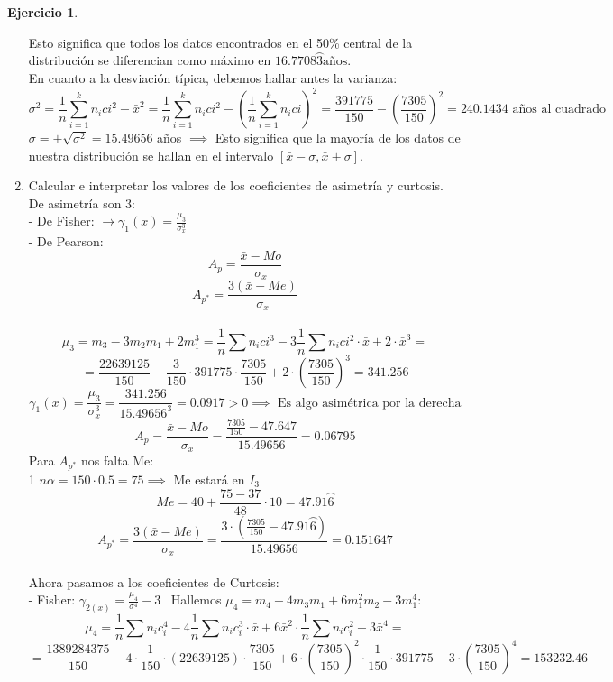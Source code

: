 \documentclass[a4paper, 12pt]{article}
\theoremstyle{definition}
\newtheorem{ej}{Ejercicio}
\begin{document}
\begin{ej}
\begin{enumerate}[label=\textit{\alph*)}]
    Esto significa que todos los datos encontrados en el 50\% central de la distribución se diferencian como máximo en $16.7708\wideparen{3} \text{años}$. \\ 
    En cuanto a la desviación típica, debemos hallar antes la varianza: 
    $$\sigma^2 = \frac{1}{n} \sum_{i = 1}^k n_{i}c{i}^2 - \bar{x}^2 = \frac{1}{n} \sum_{i = 1}^k n_{i}c{i}^2 - (\frac{1}{n} \sum_{i = 1}^k n_{i}c{i})^2 = \frac{391775}{150}- (\frac{7305}{150})^2 = 240.1434 \text{ años al cuadrado}$$
    $\sigma = +\sqrt{\sigma^2} = 15.49656$ años $\implies$ Esto significa que la mayoría de los datos de nuestra distribución se hallan en el intervalo $[\bar{x}-\sigma, \bar{x} + \sigma]$.
    \item Calcular e interpretar los valores de los coeficientes de asimetría y curtosis. \\
    De asimetría son 3: \\
    - De Fisher: $\rightarrow  \gamma_{1}(x) = \frac{\mu_{3}}{\sigma_{x}^3}$ \\
    - De Pearson: 
    $$A_{p} = \frac{\bar{x}-Mo}{\sigma_{x}}$$
    $$A_{p^*} = \frac{3(\bar{x}-Me)}{\sigma_{x}}$$
    \\
    $$\mu_{3} = m_{3} - 3m_{2}m_{1} + 2m_{1}^3 = \frac{1}{n} \sum n_{i}c{i}^3 - 3\frac{1}{n}\sum n_{i}c{i}^2 \cdot \bar{x} + 2\cdot \bar{x}^3 =$$
    $$= \frac{22639125}{150} - \frac{3}{150} \cdot 391775 \cdot \frac{7305}{150} + 2 \cdot (\frac{7305}{150})^3 = 341.256$$
    $$\gamma_{1}(x) = \frac{\mu_{3}}{\sigma_{x}^3} = \frac{341.256}{15.49656^3}= 0.0917 > 0 \implies \text{ Es algo asimétrica por la derecha}$$
    $$A_{p} = \frac{\bar{x}-Mo}{\sigma_{x}} = \frac{\frac{7305}{150}-47.647}{15.49656} = 0.06795$$
    Para $A_{p^*}$ nos falta Me: \\
    1 $n\alpha = 150 \cdot 0.5 = 75 \implies$ Me estará en $I_{3}$ \\
    $$Me = 40 + \frac{75 - 37}{48}\cdot 10 = 47.91\wideparen{6}$$
    $$A_{p^*} = \frac{3(\bar{x}-Me)}{\sigma_{x}} = \frac{3\cdot(\frac{7305}{150}-47.91\wideparen{6})}{15.49656} = 0.151647$$
    \\
    Ahora pasamos a los coeficientes de Curtosis: \\
    - Fisher: $\gamma_{2(x)} = \frac{\mu_{4}}{\sigma^4}-3$ \ Hallemos $\mu_{4} = m_{4} - 4m_{3}m_{1}+6m_{1}^2m_{2}-3m_{1}^4$: \\
    $$\mu_{4}=\frac{1}{n}\sum n_{i}c_{i}^4-4\frac{1}{n} \sum n_{i}c_{i}^3\cdot \bar{x}+6\bar{x}^2\cdot\frac{1}{n} \sum n_{i}c_{i}^2 - 3\bar{x}^4 = $$
    $$= \frac{1389284375}{150}-4 \cdot\frac{1}{150}\cdot(22639125)\cdot\frac{7305}{150} + 6\cdot(\frac{7305}{150})^2\cdot\frac{1}{150}\cdot 391775 - 3\cdot (\frac{7305}{150})^4 =153232.46$$

\end{enumerate}
\end{ej}
\end{document}
